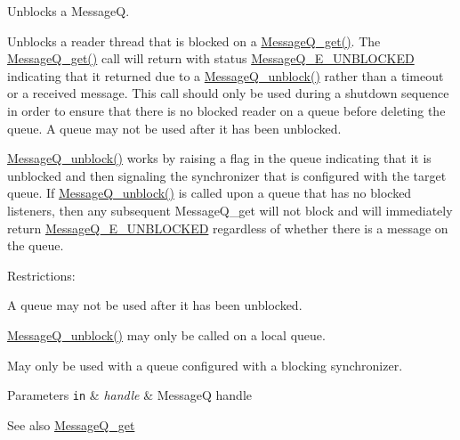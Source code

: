 Unblocks a Message\-Q. 

Unblocks a reader thread that is blocked on a \hyperlink{_message_q_8h_aaeb270f6b50d96f1e1dd134591ffc380}{Message\-Q\-\_\-get()}. The \hyperlink{_message_q_8h_aaeb270f6b50d96f1e1dd134591ffc380}{Message\-Q\-\_\-get()} call will return with status \hyperlink{_message_q_8h_a320bbc58b6a523f70d9866a54d176b44}{Message\-Q\-\_\-\-E\-\_\-\-U\-N\-B\-L\-O\-C\-K\-E\-D} indicating that it returned due to a \hyperlink{_message_q_8h_ae9491bc9f790e267836f27ad2e31d7de}{Message\-Q\-\_\-unblock()} rather than a timeout or a received message. This call should only be used during a shutdown sequence in order to ensure that there is no blocked reader on a queue before deleting the queue. A queue may not be used after it has been unblocked.

\hyperlink{_message_q_8h_ae9491bc9f790e267836f27ad2e31d7de}{Message\-Q\-\_\-unblock()} works by raising a flag in the queue indicating that it is unblocked and then signaling the synchronizer that is configured with the target queue. If \hyperlink{_message_q_8h_ae9491bc9f790e267836f27ad2e31d7de}{Message\-Q\-\_\-unblock()} is called upon a queue that has no blocked listeners, then any subsequent Message\-Q\-\_\-get will not block and will immediately return \hyperlink{_message_q_8h_a320bbc58b6a523f70d9866a54d176b44}{Message\-Q\-\_\-\-E\-\_\-\-U\-N\-B\-L\-O\-C\-K\-E\-D} regardless of whether there is a message on the queue.

Restrictions\-:
\begin{DoxyItemize}
\item A queue may not be used after it has been unblocked.
\item \hyperlink{_message_q_8h_ae9491bc9f790e267836f27ad2e31d7de}{Message\-Q\-\_\-unblock()} may only be called on a local queue.
\item May only be used with a queue configured with a blocking synchronizer.
\end{DoxyItemize}


\begin{DoxyParams}[1]{Parameters}
\mbox{\tt in}  & {\em handle} & Message\-Q handle\\
\hline
\end{DoxyParams}
\begin{DoxySeeAlso}{See also}
\hyperlink{_message_q_8h_aaeb270f6b50d96f1e1dd134591ffc380}{Message\-Q\-\_\-get} 
\end{DoxySeeAlso}
